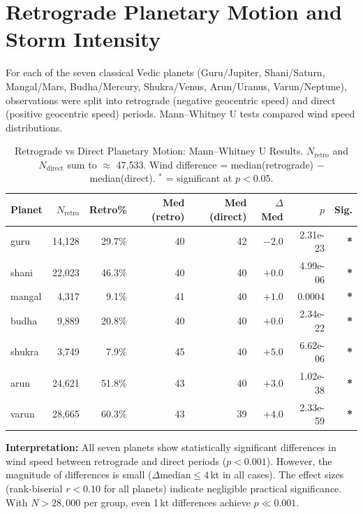 \documentclass[11pt,a4paper]{article}
\begin{document}
\section{Retrograde Planetary Motion and Storm Intensity}

For each of the seven classical Vedic planets (Guru/Jupiter, Shani/Saturn,
Mangal/Mars, Budha/Mercury, Shukra/Venus, Arun/Uranus, Varun/Neptune),
observations were split into retrograde (negative geocentric speed) and
direct (positive geocentric speed) periods. Mann--Whitney U tests compared
wind speed distributions.

\begin{table}[H]
  \centering
  \caption{Retrograde vs Direct Planetary Motion: Mann--Whitney U Results.
           $N_{\text{retro}}$ and $N_{\text{direct}}$ sum to $\approx$ 47,533.
           Wind difference = median(retrograde) $-$ median(direct).
           ${}^*$ = significant at $p < 0.05$.}
  \label{tab:retro}
  \begin{tabular}{lrrrrrrr}
    \toprule
    Planet & $N_\text{retro}$ & Retro\% & Med (retro) & Med (direct) & $\Delta$Med & $p$ & Sig. \\
    \midrule
  guru  & 14,128 & 29.7\% & 40 & 42 & $-2.0$ & 2.31e-23 & \textbf{*} \\
  shani & 22,023 & 46.3\% & 40 & 40 & $+0.0$ & 4.99e-06 & \textbf{*} \\
  mangal & 4,317 &  9.1\% & 41 & 40 & $+1.0$ & 0.0004   & \textbf{*} \\
  budha &  9,889 & 20.8\% & 40 & 40 & $+0.0$ & 2.34e-22 & \textbf{*} \\
  shukra & 3,749 &  7.9\% & 45 & 40 & $+5.0$ & 6.62e-06 & \textbf{*} \\
  arun  & 24,621 & 51.8\% & 43 & 40 & $+3.0$ & 1.02e-38 & \textbf{*} \\
  varun & 28,665 & 60.3\% & 43 & 39 & $+4.0$ & 2.33e-59 & \textbf{*} \\
    \bottomrule
  \end{tabular}
\end{table}

\medskip
\noindent\textbf{Interpretation:}
All seven planets show statistically significant differences in wind speed
between retrograde and direct periods ($p < 0.001$). However, the magnitude
of differences is small ($\Delta\text{median} \leq 4$\,kt in all cases).
The effect sizes (rank-biserial $r < 0.10$ for all planets) indicate negligible
practical significance. With $N > 28{,}000$ per group, even 1\,kt differences
achieve $p \ll 0.001$.
\end{document}
